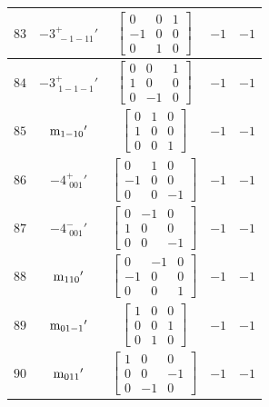 \documentclass[fleqn,8pt]{jsarticle}
\begin{document}
\begin{longtable}{ccccc}
$ 83 $ & $ -3^{+}_{\,\,-1-11}{}' $ & $ \begin{bmatrix} 0 & 0 & 1 \\ -1 & 0 & 0 \\ 0 & 1 & 0 \end{bmatrix} $ & $ -1 $ & $ -1 $ \\ \hline
$ 84 $ & $ -3^{+}_{\,\,1-1-1}{}' $ & $ \begin{bmatrix} 0 & 0 & 1 \\ 1 & 0 & 0 \\ 0 & -1 & 0 \end{bmatrix} $ & $ -1 $ & $ -1 $ \\ \hline
$ 85 $ & $ {\rm m}_{1-10}{}' $ & $ \begin{bmatrix} 0 & 1 & 0 \\ 1 & 0 & 0 \\ 0 & 0 & 1 \end{bmatrix} $ & $ -1 $ & $ -1 $ \\ \hline
$ 86 $ & $ -4^{+}_{\,\,001}{}' $ & $ \begin{bmatrix} 0 & 1 & 0 \\ -1 & 0 & 0 \\ 0 & 0 & -1 \end{bmatrix} $ & $ -1 $ & $ -1 $ \\ \hline
$ 87 $ & $ -4^{-}_{\,\,001}{}' $ & $ \begin{bmatrix} 0 & -1 & 0 \\ 1 & 0 & 0 \\ 0 & 0 & -1 \end{bmatrix} $ & $ -1 $ & $ -1 $ \\ \hline
$ 88 $ & $ {\rm m}_{110}{}' $ & $ \begin{bmatrix} 0 & -1 & 0 \\ -1 & 0 & 0 \\ 0 & 0 & 1 \end{bmatrix} $ & $ -1 $ & $ -1 $ \\ \hline
$ 89 $ & $ {\rm m}_{01-1}{}' $ & $ \begin{bmatrix} 1 & 0 & 0 \\ 0 & 0 & 1 \\ 0 & 1 & 0 \end{bmatrix} $ & $ -1 $ & $ -1 $ \\ \hline
$ 90 $ & $ {\rm m}_{011}{}' $ & $ \begin{bmatrix} 1 & 0 & 0 \\ 0 & 0 & -1 \\ 0 & -1 & 0 \end{bmatrix} $ & $ -1 $ & $ -1 $ \\ \hline

\end{longtable}
\end{document}
